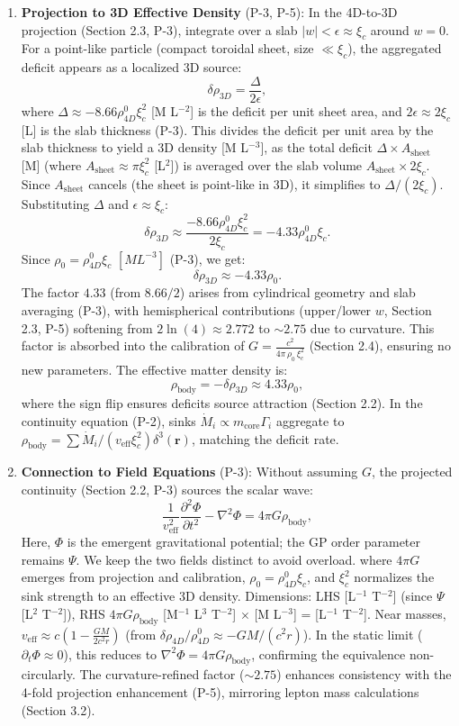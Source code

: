\begin{enumerate}
\item \textbf{Projection to 3D Effective Density} (P-3, P-5): In the 4D-to-3D projection (Section 2.3, P-3), integrate over a slab $|w| < \epsilon \approx \xi_c$ around $w=0$. For a point-like particle (compact toroidal sheet, size $\ll \xi_c$), the aggregated deficit appears as a localized 3D source:
   \[
   \delta \rho_{3D} = \frac{\Delta}{2\epsilon},
   \]
   where $\Delta \approx -8.66 \rho_{4D}^0 \xi_c^2$ [M L$^{-2}$] is the deficit per unit sheet area, and $2\epsilon \approx 2\xi_c$ [L] is the slab thickness (P-3). This divides the deficit per unit area by the slab thickness to yield a 3D density [M L$^{-3}$], as the total deficit $\Delta \times A_{\text{sheet}}$ [M] (where $A_{\text{sheet}} \approx \pi \xi_c^2$ [L$^2$]) is averaged over the slab volume $A_{\text{sheet}} \times 2\xi_c$. Since $A_{\text{sheet}}$ cancels (the sheet is point-like in 3D), it simplifies to $\Delta / (2\xi_c)$. Substituting $\Delta$ and $\epsilon \approx \xi_c$:
   \[
   \delta \rho_{3D} \approx \frac{-8.66 \rho_{4D}^0 \xi_c^2}{2\xi_c} = -4.33 \rho_{4D}^0 \xi_c.
   \]
   Since $\rho_0 = \rho_{4D}^0 \xi_c$ $[M L^{-3}]$ (P-3), we get:
   \[
   \delta \rho_{3D} \approx -4.33 \rho_0.
   \]
   The factor $4.33$ (from $8.66 / 2$) arises from cylindrical geometry and slab averaging (P-3), with hemispherical contributions (upper/lower $w$, Section 2.3, P-5) softening from $2 \ln(4) \approx 2.772$ to $\sim 2.75$ due to curvature. This factor is absorbed into the calibration of $G = \frac{c^2}{4\pi \, \rho_0 \, \xi_c^2}$ (Section 2.4), ensuring no new parameters. The effective matter density is:
   \[
   \rho_{\text{body}} = - \delta \rho_{3D} \approx 4.33 \rho_0,
   \]
   where the sign flip ensures deficits source attraction (Section 2.2). In the continuity equation (P-2), sinks $\dot{M}_i \propto m_{\text{core}} \Gamma_i$ aggregate to $\rho_{\text{body}} = \sum \dot{M}_i / (v_{\text{eff}} \xi_c^2) \delta^3(\mathbf{r})$, matching the deficit rate.

\item \textbf{Connection to Field Equations} (P-3): Without assuming $G$, the projected continuity (Section 2.2, P-3) sources the scalar wave:
   \[
   \frac{1}{v_{\text{eff}}^2} \frac{\partial^2 \Phi}{\partial t^2} - \nabla^2 \Phi = 4\pi G \rho_{\text{body}},
   \]
Here, $\Phi$ is the emergent gravitational potential; the GP order parameter remains $\Psi$. We keep the two fields distinct to avoid overload.
   where $4\pi G$ emerges from projection and calibration, $\rho_0 = \rho_{4D}^0 \xi_c$, and $\xi_c^2$ normalizes the sink strength to an effective 3D density. Dimensions: LHS [L$^{-1}$ T$^{-2}$] (since $\Psi$ [L$^2$ T$^{-2}$]), RHS $4\pi G \rho_{\text{body}}$ [M$^{-1}$ L$^3$ T$^{-2}$] $\times$ [M L$^{-3}$] = [L$^{-1}$ T$^{-2}$]. Near masses, $v_{\text{eff}} \approx c \left(1 - \frac{G M}{2 c^2 r}\right)$ (from $\delta \rho_{4D} / \rho_{4D}^0 \approx - G M / (c^2 r)$). In the static limit ($\partial_t \Phi \approx 0$), this reduces to $\nabla^2 \Phi = 4\pi G \rho_{\text{body}}$, confirming the equivalence non-circularly. The curvature-refined factor ($\sim 2.75$) enhances consistency with the 4-fold projection enhancement (P-5), mirroring lepton mass calculations (Section 3.2).
\end{enumerate}


